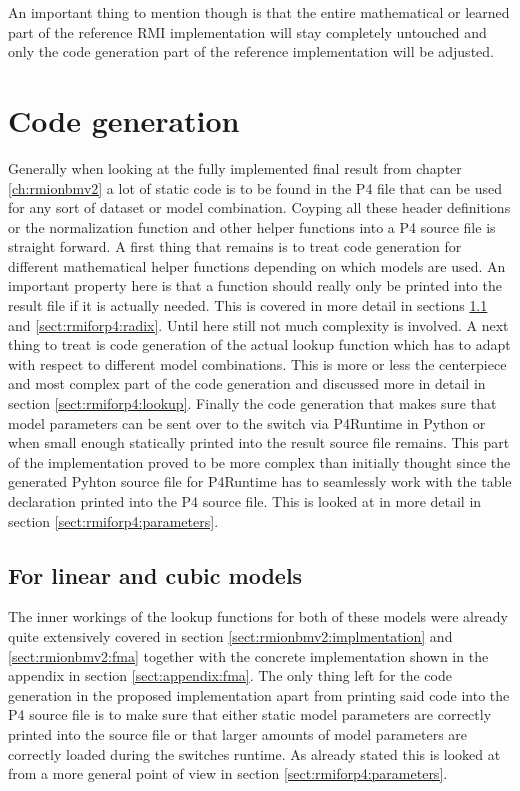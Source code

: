 An important thing to mention though is that the entire mathematical or learned part of the reference RMI implementation will stay completely untouched and only the code generation part of the reference implementation will be adjusted.

\section{Code generation}
Generally when looking at the fully implemented final result from chapter \ref{ch:rmionbmv2} a lot of static code is to be found in the P4 file that can be used for any sort of dataset or model combination. Coyping all these header definitions or the normalization function and other helper functions into a P4 source file is straight forward. A first thing that remains is to treat code generation for different mathematical helper functions depending on which models are used. An important property here is that a function should really only be printed into the result file if it is actually needed. This is covered in more detail in sections \ref{sect:rmiforp4:linear_cubic} and \ref{sect:rmiforp4:radix}. Until here still not much complexity is involved. A next thing to treat is code generation of the actual lookup function which has to adapt with respect to different model combinations. This is more or less the centerpiece and most complex part of the code generation and discussed more in detail in section \ref{sect:rmiforp4:lookup}. Finally the code generation that makes sure that model parameters can be sent over to the switch via P4Runtime in Python or when small enough statically printed into the result source file remains. This part of the implementation proved to be more complex than initially thought since the generated Pyhton source file for P4Runtime has to seamlessly work with the table declaration printed into the P4 source file. This is looked at in more detail in section \ref{sect:rmiforp4:parameters}.

\subsection{For linear and cubic models}
\label{sect:rmiforp4:linear_cubic}
The inner workings of the lookup functions for both of these models were already quite extensively covered in section \ref{sect:rmionbmv2:implmentation} and \ref{sect:rmionbmv2:fma} together with the concrete implementation shown in the appendix in section \ref{sect:appendix:fma}. The only thing left for the code generation in the proposed implementation apart from printing said code into the P4 source file is to make sure that either static model parameters are correctly printed into the source file or that larger amounts of model parameters are correctly loaded during the switches runtime. As already stated this is looked at from a more general point of view in section \ref{sect:rmiforp4:parameters}.

